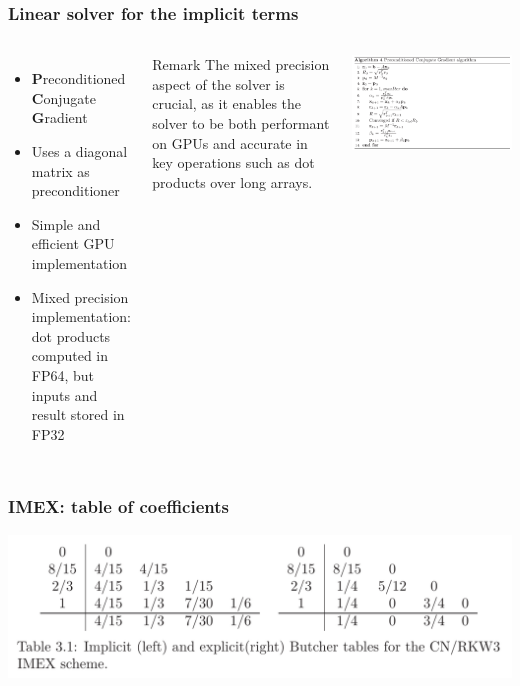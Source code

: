     \begin{frame}
    \frametitle{Linear solver for the implicit terms}
    
    \begin{columns}
    
    
    \begin{itemize}
        \item \textbf{P}reconditioned \textbf{C}onjugate \textbf{G}radient
        \item Uses a diagonal matrix as preconditioner
        \item Simple and efficient GPU implementation
        \item Mixed precision implementation: dot products computed in FP64, but inputs and result stored in FP32
    \end{itemize}
    
    \begin{block}{Remark}
        The mixed precision aspect of the solver is crucial, as it enables the solver to be both performant on GPUs and accurate in key operations such as dot products over long arrays.
    \end{block}
    
    
    \includegraphics[width=1.1\textwidth]{images/pcg_basic.png}
    
    \end{columns}
    
    \end{frame}
    
    \begin{frame}
    \frametitle{IMEX: table of coefficients}
    
    \includegraphics[width=1.0\textwidth]{images/imex_rkwcn.png}
    \end{frame}
    
